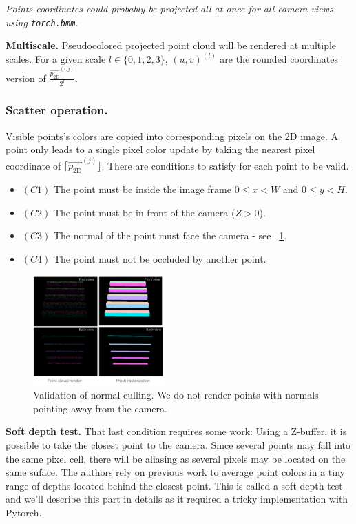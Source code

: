 \noindent \textit{Points coordinates could probably be projected all at once for all camera views using \texttt{torch.bmm}.}


\noindent \textbf{Multiscale.} Pseudocolored projected point cloud will be rendered at multiple scales. For a given scale $l \in \{0, 1, 2, 3\}$, 
$(u,v)^{(l)}$ are the rounded coordinates version of $\frac{\vec{p_{\textrm{2D}}}^{(i,j)}}{2^{l}}$.

\subsubsection{Scatter operation.}
\label{sec:scatter_op}

Visible points's colors are copied into corresponding pixels on the 2D image. A point only leads to a single pixel color update by taking the nearest pixel coordinate of $\lceil\vec{p_{\textrm{2D}}}^{(j)}\rfloor$. There are conditions to satisfy for each point to be valid. 
\begin{itemize}
    \item $(C1)$ The point must be inside the image frame $0\leq x<W$ and $0\leq y <H$.
    \item $(C2)$ The point must be in front of the camera ($Z>0$).
    \item $(C3)$ The normal of the point must face the camera - see ~\cref{fig:normal_culling_validation}.
    \item $(C4)$ The point must not be occluded by another point.
\end{itemize}

\begin{figure}[htpb]
    \centering
    \includegraphics[width=0.45\textwidth]{figures/normal_culling_validation.png}
    \caption{Validation of normal culling. We do not render points with normals pointing away from the camera.}
    \label{fig:normal_culling_validation}
\end{figure}



\noindent \textbf{Soft depth test.} 
That last condition requires some work:
Using a Z-buffer, it is possible to take the closest point to the camera. Since several points may fall into the same pixel cell, there will be aliasing as several pixels may be located on the same suface. The authors rely on previous work \cite{schutz2021rendering} to average point colors in a tiny range of depths located behind the closest point. This is called a soft depth test and we'll describe this part in details as it required a tricky implementation with Pytorch.

